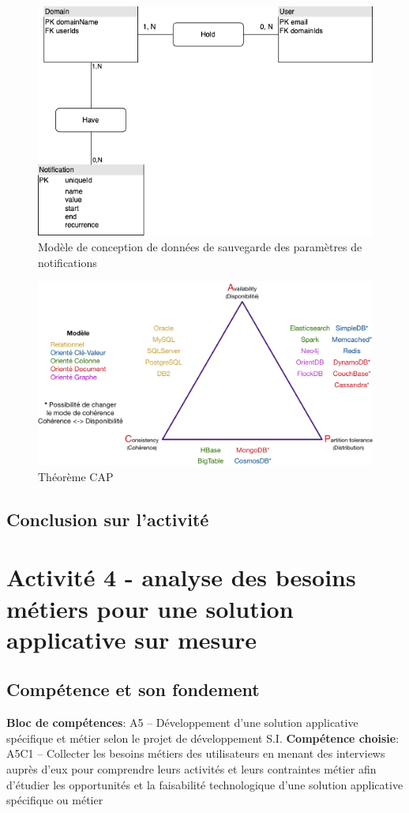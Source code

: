 \documentclass[a4paper, 11pt]{report}
\begin{document}
  \begin{figure}[h]
      \centering
      \includegraphics[scale=0.40,center]{schemas/notifications-mcd-calhoun.png}
      \caption{Modèle de conception de données de sauvegarde des paramètres de notifications}
  \end{figure}
  \begin{figure}[h]
      \centering
      \includegraphics[scale=0.25,center]{schemas/cap-theoreme.png}
      \caption{Théorème CAP}
  \end{figure}
\subsection{Conclusion sur l'activité}

\section{Activité 4 - analyse des besoins métiers pour une solution applicative sur mesure}
\subsection{Compétence et son fondement}
\textbf{Bloc de compétences}: A5 – Développement d’une solution applicative spécifique et métier selon le projet de développement S.I.
\newline
\textbf{Compétence choisie}: A5C1 – Collecter les besoins métiers des utilisateurs en menant des interviews auprès d’eux pour comprendre leurs activités et leurs contraintes métier afin d’étudier les opportunités et la faisabilité technologique d’une solution applicative spécifique ou métier
\end{document}
